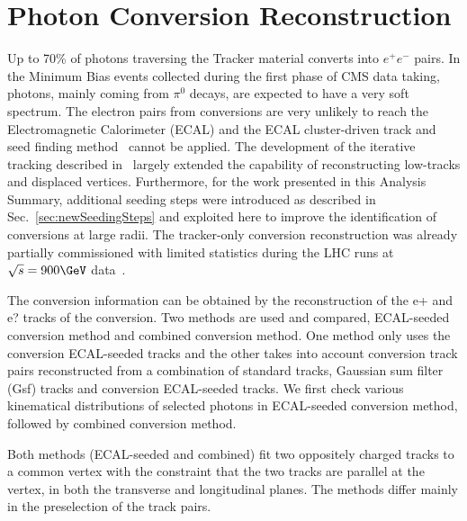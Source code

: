\section{Photon Conversion Reconstruction}
\label{standard}


Up to 70\% of photons traversing the Tracker material converts into  $e^+ e^-$ pairs.
In the Minimum Bias events collected during the  first phase of CMS data taking, photons, mainly coming from
$\pi^0$ decays, are expected to have a very soft spectrum. The electron pairs from conversions are very unlikely to
reach the Electromagnetic Calorimeter (ECAL) and the ECAL cluster-driven track and seed finding method~\cite{NOTE2006005, EGM-10-005}
cannot be applied. The development of the iterative tracking described in~\cite{TRK-10-001}
largely extended the capability of reconstructing low-\pt tracks and displaced vertices.
Furthermore, for the work presented in this Analysis Summary, additional seeding steps were introduced as described in Sec.~\ref{sec:newSeedingSteps}
and exploited here to improve the identification of conversions at large radii.
The tracker-only conversion reconstruction was already partially commissioned with limited statistics
during the LHC runs at $\sqrt{s}=900\GeV$ data~\cite{TRK-10-001}.


The conversion information can be obtained by the reconstruction of the e+ and e? tracks of the
	conversion. Two methods are used and compared, ECAL-seeded conversion method and combined conversion method. One method only uses the conversion ECAL-seeded tracks and the 	other takes into account conversion track pairs reconstructed from a combination of standard 	tracks, Gaussian sum filter (Gsf) tracks and conversion ECAL-seeded tracks. We first check various kinematical distributions of selected photons in ECAL-seeded conversion method, followed by combined conversion method.


Both methods (ECAL-seeded and combined) 	fit two oppositely charged tracks to a common vertex with the constraint that the two tracks 	are parallel at the vertex, in both the transverse and longitudinal planes. The methods differ 	mainly in the preselection of the track pairs.



